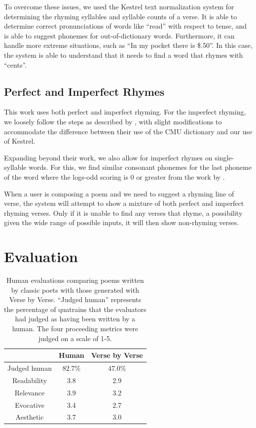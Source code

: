 \documentclass[11pt]{article}
\begin{document}
To overcome these issues, we used the Kestrel text normalization system \cite{ebden2015} for determining the rhyming syllables and syllable counts of a verse.
It is able to determine correct pronunciations of words like ``read'' with respect to tense, and is able to suggest phonemes for out-of-dictionary words.
Furthermore, it can handle more extreme situations, such as ``In my pocket there is \$.50''.
In this case, the system is able to understand that it needs to find a word that rhymes with ``cents''.

\subsection{Perfect and Imperfect Rhymes}

This work uses both perfect and imperfect rhyming.
For the imperfect rhyming, we loosely follow the steps as described by \citet{ghazvininejad2016}, with slight modifications to accommodate the difference between their use of the CMU dictionary and our use of Kestrel.

Expanding beyond their work, we also allow for imperfect rhymes on single-syllable words.
For this, we find similar consonant phonemes for the last phoneme of the word where the logs-odd scoring is 0 or greater from the work by \citet{hirjee2010}.

When a user is composing a poem and we need to suggest a rhyming line of verse, the system will attempt to show a mixture of both perfect and imperfect rhyming verses.
Only if it is unable to find any verses that rhyme, a possibility given the wide range of possible inputs, it will then show non-rhyming verses.




\section{Evaluation}


\begin{table}
    \centering
    \begin{tabular}{ c | c | c} \toprule
       & Human & Verse by Verse \\ \midrule
       Judged human & $82.7\%$ & $47.0\%$ \\
       Readability & 3.8 & 2.9 \\
       Relevance & 3.9 & 3.2 \\
       Evocative & 3.4 & 2.7 \\
       Aesthetic & 3.7 & 3.0 \\ \bottomrule
    \end{tabular}
    \caption{Human evaluations comparing poems written by classic poets with those generated with Verse by Verse. ``Judged human'' represents the percentage of quatrains that the evaluators had judged as having been written by a human. The four proceeding metrics were judged on a scale of 1-5.}
    \label{tab:human}
\end{table}
\end{document}
